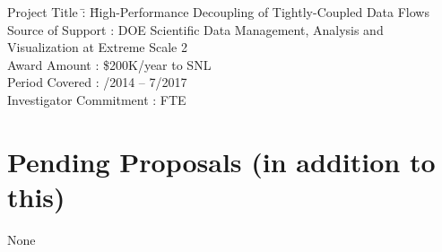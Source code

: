 \documentclass[10pt]{article}
\begin{document}
\begin{tabbing}
Project Title \hspace{5.5em}\=: \= High-Performance Decoupling of Tightly-Coupled Data Flows\\
Source of Support           \>: \> DOE Scientific Data Management, Analysis and Visualization at Extreme Scale 2\\
Award Amount                \>: \> \$200K/year to SNL\\
Period Covered              \>: /2014 -- 7/2017\\
Investigator Commitment     \>:  FTE
\end{tabbing}

\section*{Pending Proposals (in addition to this)}

None

\end{document}
